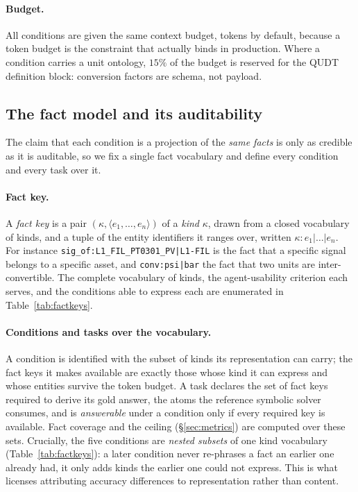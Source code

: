 \paragraph{Budget.} All conditions are given the same context budget, \TokenBudget{}
tokens by default, because a token budget is the constraint that actually binds
in production. Where a condition carries a unit ontology, $15\%$ of the budget is
reserved for the QUDT definition block: conversion factors are schema, not
payload.

\subsection{The fact model and its auditability}
\label{sec:factmodel}

The claim that each condition is a projection of the \emph{same facts} is only
as credible as it is auditable, so we fix a single fact vocabulary and define
every condition and every task over it.

\paragraph{Fact key.} A \emph{fact key} is a pair $(\kappa,\langle
e_1,\dots,e_n\rangle)$ of a \emph{kind} $\kappa$, drawn from a closed vocabulary
of \NFactKinds{} kinds, and a tuple of the entity identifiers it ranges over,
written $\kappa{:}e_1|\dots|e_n$. For instance
\texttt{sig\_of:L1\_FIL\_PT0301\_PV|L1-FIL} is the fact that a specific signal
belongs to a specific asset, and \texttt{conv:psi|bar} the fact that two units
are inter-convertible. The complete vocabulary of kinds, the agent-usability
criterion each serves, and the conditions able to express each are enumerated in
Table~\ref{tab:factkeys}.

\paragraph{Conditions and tasks over the vocabulary.} A condition is identified
with the subset of kinds its representation can carry; the fact keys it makes
available are exactly those whose kind it can express and whose entities survive
the token budget. A task declares the set of fact keys required to derive its
gold answer, the atoms the reference symbolic solver consumes, and is
\emph{answerable} under a condition only if every required key is available.
Fact coverage and the ceiling (\S\ref{sec:metrics}) are computed over these
sets. Crucially, the five conditions are \emph{nested subsets} of one kind
vocabulary (Table~\ref{tab:factkeys}): a later condition never re-phrases a fact
an earlier one already had, it only adds kinds the earlier one could not
express. This is what licenses attributing accuracy differences to
representation rather than content.

